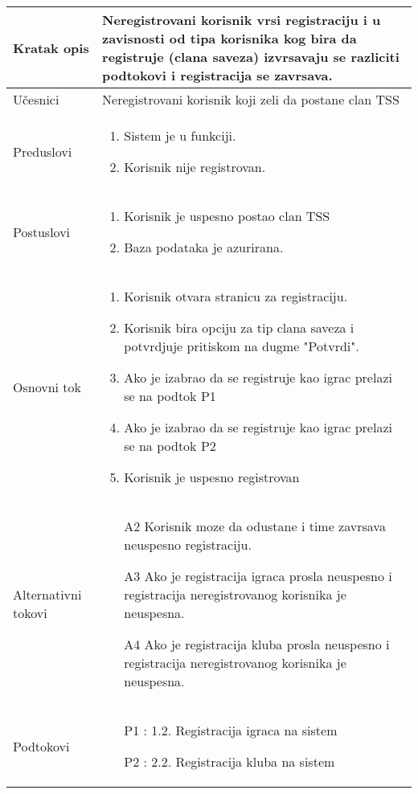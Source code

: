 \documentclass{article}
\begin{document}

\begin{longtable}{| p{} | p{} |} 
\hline
    Kratak opis & Neregistrovani korisnik vrsi registraciju i u zavisnosti od tipa korisnika kog bira da registruje (clana saveza) izvrsavaju se razliciti podtokovi i registracija se zavrsava.\\ 
\hline    
    Učesnici & 
         Neregistrovani korisnik koji zeli da postane clan TSS
    \\
\hline
   Preduslovi & \begin{enumerate}
       \item Sistem je u funkciji.
       \item Korisnik nije registrovan.
   \end{enumerate}\\
\hline  
    Postuslovi & \begin{enumerate}
        \item Korisnik je uspesno postao clan TSS
        \item Baza podataka je azurirana.
    \end{enumerate}\\
\hline
    Osnovni tok & \begin{enumerate}
        \item Korisnik otvara stranicu za registraciju.
        \item Korisnik bira opciju za tip clana saveza i potvrdjuje pritiskom na dugme "Potvrdi".
        \item Ako je izabrao da se registruje kao igrac prelazi se na podtok P1
        \item Ako je izabrao da se registruje kao igrac prelazi se na podtok P2
        \item Korisnik je uspesno registrovan
    \end{enumerate}\\
\hline
    Alternativni tokovi & \begin{itemize}
        \item[A2] Korisnik moze da odustane i time zavrsava neuspesno registraciju. 
        \item[A3] Ako je registracija igraca prosla neuspesno i registracija neregistrovanog korisnika je neuspesna.
        \item[A4] Ako je registracija kluba prosla neuspesno i registracija neregistrovanog korisnika je neuspesna.
    \end{itemize}\\
\hline
    Podtokovi & \begin{itemize}
        \item[P1]: 1.2. Registracija igraca na sistem
        \item[P2]: 2.2. Registracija kluba na sistem


\end{itemize}
\end{longtable}
\end{document}
